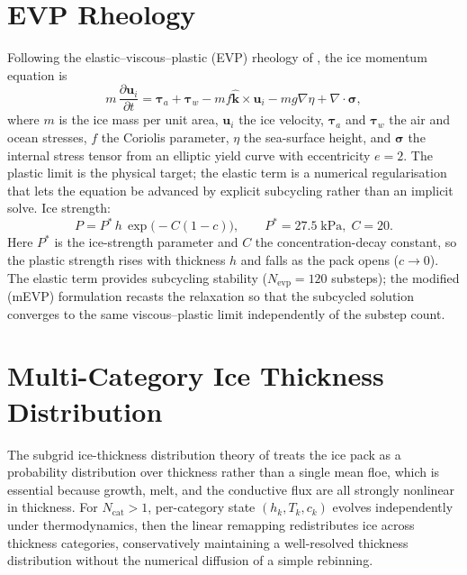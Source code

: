 \documentclass[11pt,twoside]{report}
\newcommand{\pp}{\partial}
\newcommand{\vect}[1]{\bm{#1}}
\newcommand{\grad}{\nabla}
\newcommand{\divg}{\nabla\!\cdot\!}
\begin{document}
\section{EVP Rheology}

Following the elastic--viscous--plastic (EVP) rheology of
\citet{HunkeDukowicz1997}, the ice momentum equation is
\begin{equation}
  m\,\frac{\pp\vect{u}_i}{\pp t} = \vect{\tau}_a + \vect{\tau}_w
  - mf\hat{\vect{k}}\times\vect{u}_i
  - mg\grad\eta + \divg\bm{\sigma},
\end{equation}
where $m$ is the ice mass per unit area, $\vect{u}_i$ the ice velocity,
$\vect{\tau}_a$ and $\vect{\tau}_w$ the air and ocean stresses, $f$ the Coriolis
parameter, $\eta$ the sea-surface height, and $\bm{\sigma}$ the internal stress
tensor from an elliptic yield curve with eccentricity $e=2$.  The plastic limit
is the physical target; the elastic term is a numerical regularisation that lets
the equation be advanced by explicit subcycling rather than an implicit solve.
Ice strength:
\begin{equation}
  P = P^*\,h\,\exp\!\big(-C(1-c)\big),
  \qquad P^*=27.5\;\text{kPa},\; C=20.
\end{equation}
Here $P^*$ is the ice-strength parameter and $C$ the concentration-decay
constant, so the plastic strength rises with thickness $h$ and falls as the pack
opens ($c\to0$).  The elastic term provides subcycling stability
($N_{\mathrm{evp}}=120$ substeps); the modified (mEVP) formulation
\citep{Bouillon2013} recasts the relaxation so that the subcycled solution
converges to the same viscous--plastic limit independently of the substep count.


\section{Multi-Category Ice Thickness Distribution}

The subgrid ice-thickness distribution theory of \citet{Thorndike1975} treats
the ice pack as a probability distribution over thickness rather than a single
mean floe, which is essential because growth, melt, and the conductive flux are
all strongly nonlinear in thickness.  For $N_{\mathrm{cat}}>1$, per-category
state $(h_k,T_k,c_k)$ evolves independently under thermodynamics, then the
\citet{Lipscomb2001} linear remapping redistributes ice across thickness
categories, conservatively maintaining a well-resolved thickness distribution
without the numerical diffusion of a simple rebinning.
\end{document}
